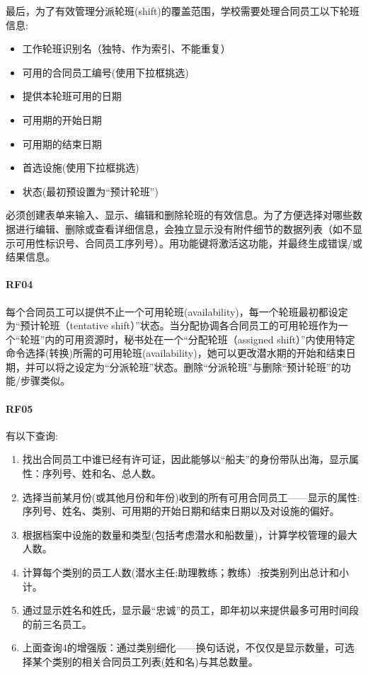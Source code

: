 最后，为了有效管理分派轮班(shift)的覆盖范围，学校需要处理合同员工以下轮班信息:

\begin{itemize}
\tightlist
\item
  工作轮班识别名（独特、作为索引、不能重复）
\item
  可用的合同员工编号(使用下拉框挑选)
\item
  提供本轮班可用的日期
\item
  可用期的开始日期
\item
  可用期的结束日期
\item
  首选设施(使用下拉框挑选)
\item
  状态(最初预设置为``预计轮班'')
\end{itemize}

必须创建表单来输入、显示、编辑和删除轮班的有效信息。为了方便选择对哪些数据进行编辑、删除或查看详细信息，会独立显示没有附件细节的数据列表（如不显示可用性标识号、合同员工序列号）。用功能键将激活这功能，并最终生成错误/或结果信息。

\hypertarget{rf04}{%
\paragraph{RF04}\label{rf04}}

每个合同员工可以提供不止一个可用轮班(availability)，每一个轮班最初都设定为“预计轮班（tentative shift）”状态。当分配协调各合同员工的可用轮班作为一个“轮班”内的可用资源时，秘书处在一个“分配轮班（assigned shift）”内使用特定命令选择(转换)所需的可用轮班(availability)，她可以更改潜水期的开始和结束日期，并可以将之设定为“分派轮班”状态。删除“分派轮班”与删除“预计轮班”的功能/步骤类似。

\hypertarget{rf05}{%
\paragraph{RF05}\label{rf05}}

有以下查询:

\begin{enumerate}
\tightlist
\item
  找出合同员工中谁已经有许可证，因此能够以``船夫''的身份带队出海，显示属性：序列号、姓和名、总人数。
\item
  选择当前某月份(或其他月份和年份)收到的所有可用合同员工------显示的属性:序列号、姓名、类别、可用期的开始日期和结束日期以及对设施的偏好。
\item
  根据档案中设施的数量和类型(包括考虑潜水和船数量)，计算学校管理的最大人数。
\item
  计算每个类别的员工人数(潜水主任;助理教练；教练）:按类别列出总计和小计。
\item
  通过显示姓名和姓氏，显示最``忠诚''的员工，即年初以来提供最多可用时间段的前三名员工。
\item
  上面查询4的增强版：通过类别细化------换句话说，不仅仅是显示数量，可选择某个类别的相关合同员工列表(姓和名)与其总数量。
\end{enumerate}

